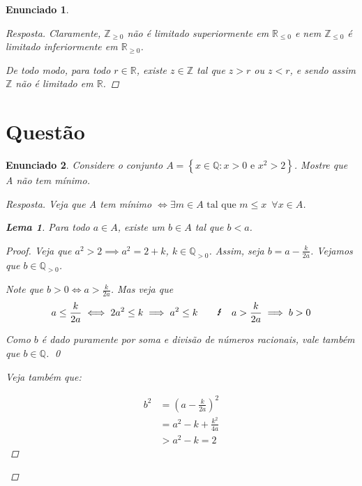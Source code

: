 \documentclass[a4paper,twoside,11pt]{article}
\newtheorem*{enunciado}{Enunciado}
\newtheorem*{lemma}{Lema}
\begin{document}
\begin{enunciado}
\begin{proof}[Resposta]
        Claramente, $\mathbb{Z}_{\geq 0}$ não é limitado superiormente em $\mathbb{R}_{\leq 0}$ e nem $\mathbb{Z}_{\leq 0}$
        é limitado inferiormente em $\mathbb{R}_{\geq 0}$.

        De todo modo, para todo $r \in \mathbb{R}$, existe $z \in \mathbb{Z}$ tal que $z > r$ ou $z < r$, e sendo assim
        $\mathbb{Z}$ não é limitado em $\mathbb{R}$.

    \end{proof}
\end{enunciado}



\section{Questão}
\begin{enunciado}
    Considere o conjunto $A = \left\{ x \in \mathbb{Q} : x > 0 \text{ e } x^2 > 2 \right\}$.
    Mostre que A não tem mínimo.

    \begin{proof}[Resposta]
        Veja que A tem mínimo $\iff \exists m \in A \text{ tal que } m \leq x \enspace \forall x \in A$.

        \begin{lemma}
            Para todo $a \in A$, existe um $b \in A$ tal que $b < a$.

            \begin{proof}
                Veja que $a^2 > 2 \implies a^2 = 2 + k$, $k \in \mathbb{Q}_{>0}$.
                Assim, seja $b = a - \frac{k}{2a}$. Vejamos que $b \in \mathbb{Q}_{>0}$.
                
                Note que $b > 0 \iff a > \frac{k}{2a}$. Mas veja que
                \begin{equation} \label{eq:b>0}
                    \begin{split}
                         a \leq \frac{k}{2a} \iff 2a^2 \leq k \implies a^2 \leq k \text
                         \qquad \text{\Lightning} \quad a > \frac{k}{2a} \implies b > 0
                    \end{split}
                \end{equation}
                
                Como $b$ é dado puramente por soma e divisão de números racionais, vale também que
                $b \in \mathbb{Q}$. \qed

                Veja também que:

                \begin{equation} \label{eq:b^2_>_2}
                    \begin{split}
                        b^2 &= (a - \frac{k}{2a})^2 \\
                            &= a^2 - k + \frac{k^2}{4a} \\
                            &> a^2 - k = 2
                    \end{split}
                \end{equation}


\end{proof}
\end{lemma}
\end{proof}
\end{enunciado}
\end{document}
